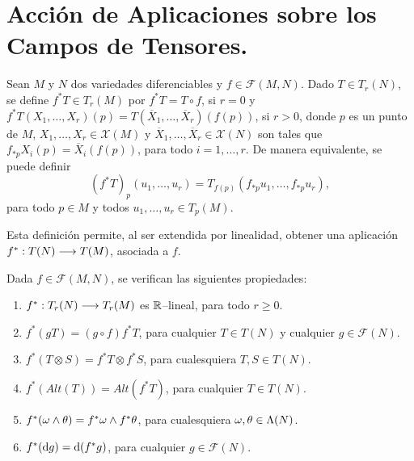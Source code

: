 \documentclass[cursovd_portada.tex]{subfiles}
\begin{document}
\section{Acción de Aplicaciones sobre los Campos de Tensores.}
\begin{defi}
Sean $M$ y $N$ dos variedades diferenciables y
$f\in\mathcal{F}(M,N)$. Dado $T\in T_r(N)$, se define $f^*T\in
T_r(M)$ por $f^*T=T\circ f$, si $r=0$ y $f^*T(X_1,\dots ,X_r)(p)=
T(\overline{X}_1,\dots ,\overline{X}_r)(f(p))$, si $r>0$, donde
$p$ es un punto de $M$, $X_1,\dots ,X_r\in\mathcal{X}(M)$ y
$\overline{X}_1,\dots ,\overline{X}_r\in\mathcal{X}(N)$ son tales
que $f_{*p}X_i(p)=\overline{X}_i(f(p))$, para todo $i=1,\dots ,r$.
De manera equivalente, se puede definir
$$(f^*T)_p(u_1,\dots,u_r)=T_{f(p)}(f_{*p}u_1,\dots,f_{*p}u_r),$$
para todo $p\in M$ y todos $u_1,\dots,u_r \in T_p(M)$.
\end{defi}
Esta definición permite, al ser extendida por linealidad, obtener una aplicación $f^*:T(N)\longrightarrow T(M)$, asociada a
$f$.
\begin{prop}
Dada $f\in\mathcal{F}(M,N)$, se verifican las siguientes
propiedades:
\begin{enumerate}
\item $f^*:T_r(N)\longrightarrow T_r(M)$ es $\mathbb{R}$--lineal, para todo $r\geq 0$.
\item $f^*(gT)=(g\circ f)f^*T$, para cualquier $T\in T(N)$ y
cualquier $g\in \mathcal{F}(N)$. \item $f^*(T\otimes
S)=f^*T\otimes f^*S$, para cualesquiera $T,S\in T(N)$. \item
$f^*(Alt(T))=Alt(f^*T)$, para cualquier $T\in T(N)$. \item
$f^*(\omega\wedge\theta)=f^*\omega\wedge f^*\theta$, para cualesquiera
$\omega,\theta\in\Lambda(N)$. \item $f^*({\rm d} g)={\rm d} (f^*g)$, para
cualquier $g\in\mathcal{F}(N)$.
\end{enumerate}
\end{prop}

\newpage
\end{document}
